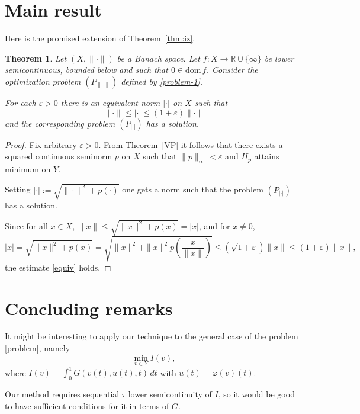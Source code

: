 \documentclass[12pt,leqno]{article}
\newtheorem{thm}{Theorem}[section]
\theoremstyle{definition}
\theoremstyle{remark}
\def\ds{\displaystyle}
\def\eps{\varepsilon}
\def\dom{\mathrm{dom\,}}
\begin{document}
\section{Main result}\label{sec:main}

Here is the promised extension of Theorem~\ref{thm:iz}.

\begin{thm}\label{main}
    Let $(X,\|\cdot\|)$ be a Banach space. Let $f: X \rightarrow \mathbb{R} \cup\{\infty\}$ be  lower semicontinuous, bounded below and such that $0\in \dom f$.
Consider the optimization problem $\left(P_{\|\cdot\|}\right)$ defined by \eqref{problem-1}.

For each $\varepsilon>0$ there is an equivalent norm $|\cdot|$ on $X$ such that
\begin{equation}\label{equiv}
\|\cdot\| \leq|\cdot| \leq(1+\varepsilon)\|\cdot\|
\end{equation}
and the corresponding problem $\left(P_{|\cdot|}\right)$ has a solution.
\end{thm}

\begin{proof}
Fix arbitrary $\eps >0$. From Theorem~\ref{VP} it follows that   there exists a squared  continuous seminorm $p$ on $X$ such that $\|p\|_\infty <\eps$ and
$H_p$ attains minimum on $Y$.


Setting $|\cdot|:=\sqrt{\|\cdot\|^2 +p(\cdot)}$ one gets a norm such that the problem $(P_{|\cdot|})$ has a solution.

Since for all $x\in X$, $\|x\|\le \sqrt{\|x\|^2+p(x)}=|x|$,  and for $x\neq 0$,
\[
|x|= \sqrt{\|x\|^2+p(x)}= \sqrt{ \|x\|^2 +\|x\|^2 p\left(\frac{x}{\|x\|}\right)} \le (\sqrt{1+\eps})\|x\|\le (1+\eps)\|x\|,
\]
the estimate \eqref{equiv} holds.
\end{proof}

\section{Concluding remarks}\label{sec:concl}

It might be interesting to apply our technique to the  general case of the problem \eqref{problem}, namely
\[
\min_{v\in Y} I(v),
\]
where $\ds I(v)= \int_0^1 G(v(t),u(t),t)\, dt$ with $u(t)=\varphi(v)(t)$.

    Our method requires sequential $\tau$ lower semicontinuity of $I$, so it would be good to have sufficient conditions for it in terms of $G$.
\end{document}
